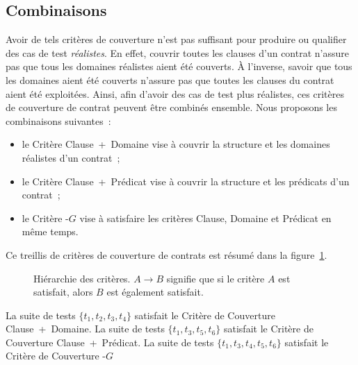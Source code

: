 \subsection{Combinaisons}
\label{subsection:test:combination}

Avoir de tels critères de couverture n'est pas suffisant pour produire ou
qualifier des cas de test {\em réalistes}. En effet, couvrir toutes les clauses
d'un contrat n'assure pas que tous les domaines réalistes aient été couverts. À
l'inverse, savoir que tous les domaines aient été couverts n'assure pas que
toutes les clauses du contrat aient été exploitées. Ainsi, afin d'avoir des cas
de test plus réalistes, ces critères de couverture de contrat peuvent être
combinés ensemble.  Nous proposons les combinaisons suivantes~:
%
\begin{itemize}

\item le Critère Clause~+~Domaine vise à couvrir la structure et les domaines
réalistes d'un contrat~;

\item le Critère Clause~+~Prédicat vise à couvrir la structure et les prédicats
d'un contrat~;

\item le Critère -$G$ vise à satisfaire les critères Clause,
Domaine et Prédicat en même temps.

\end{itemize}
%
Ce {\strong treillis} de critères de couverture de contrats est résumé dans la
figure~\ref{figure:test:lattice}.

\begin{figure}


\caption{\label{figure:test:lattice} Hiérarchie des critères. $A \rightarrow B$
signifie que si le critère $A$ est satisfait, alors $B$ est également
satisfait.}

\end{figure}

\begin{example}

La suite de tests $\{t_1, t_2, t_3, t_4\}$ satisfait le Critère de Couverture
Clause~+~Domaine. La suite de tests $\{t_1, t_3, t_5, t_6\}$ satisfait le
Critère de Couverture Clause~+~Prédicat. La suite de tests $\{t_1, t_3, t_4,
t_5, t_6\}$ satisfait le Critère de Couverture -$G$

\end{example}
